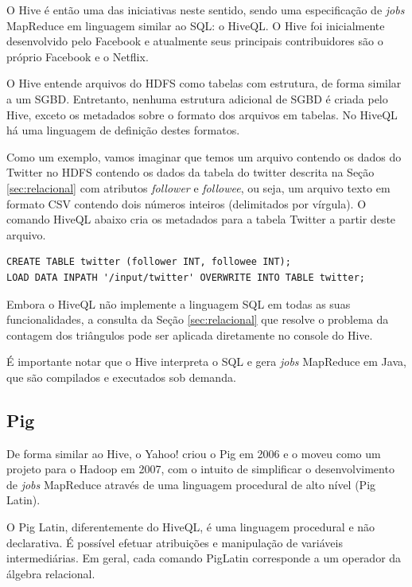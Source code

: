 O Hive \cite{thusoo2009hive} é então uma das iniciativas neste sentido, sendo uma especificação de 
\textit{jobs} MapReduce em linguagem similar ao SQL: o HiveQL. O Hive foi inicialmente desenvolvido 
pelo Facebook e atualmente seus principais contribuidores são o próprio Facebook e o Netflix.

O Hive entende arquivos do HDFS como tabelas com estrutura, de forma similar a um SGBD. Entretanto, 
nenhuma estrutura adicional de SGBD é criada pelo Hive, exceto os metadados sobre o formato dos arquivos 
em tabelas. No HiveQL há uma linguagem de definição destes formatos.

Como um exemplo, vamos imaginar que temos um arquivo contendo os dados do Twitter no HDFS contendo 
os dados da tabela do twitter descrita na Seção \ref{sec:relacional} com atributos \textit{follower} e
\textit{followee}, ou seja, um arquivo texto em formato CSV contendo dois números inteiros (delimitados
por vírgula). O comando HiveQL abaixo cria os metadados para a tabela Twitter a partir deste arquivo.

\begin{verbatim}
CREATE TABLE twitter (follower INT, followee INT);
LOAD DATA INPATH '/input/twitter' OVERWRITE INTO TABLE twitter;
\end{verbatim}

Embora o HiveQL não implemente a linguagem SQL em todas as suas funcionalidades, a consulta da
Seção \ref{sec:relacional} que resolve o problema da contagem dos triângulos pode ser aplicada
diretamente no console do Hive.

É importante notar que o Hive interpreta o SQL e gera \textit{jobs} MapReduce em Java, que são
compilados e executados sob demanda.

\subsection{Pig}

De forma similar ao Hive, o Yahoo! criou o Pig \cite{olston2008pig} em 2006 e o moveu como um projeto 
para o Hadoop em 2007, com o intuito de simplificar o desenvolvimento de \textit{jobs} MapReduce 
através de uma linguagem procedural de alto nível (Pig Latin).

O Pig Latin, diferentemente do HiveQL, é uma linguagem procedural e não declarativa. É possível 
efetuar atribuições e manipulação de variáveis intermediárias. Em geral, cada comando PigLatin
corresponde a um operador da álgebra relacional.

